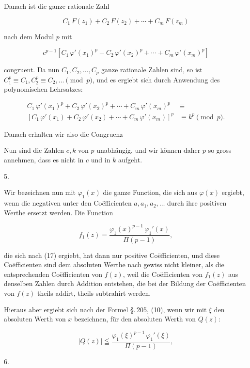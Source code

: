 Danach ist die ganze rationale Zahl

\[
C_1\,F(z_1)+C_2\,F(z_2)+\cdots+C_m\,F(z_m)
\]

nach dem Modul $p$ mit

\[
c^{p-1}\left[C_1\,\varphi'(x_1)^p+C_2\,\varphi'(x_2)^p+\cdots+C_m\,\varphi'(x_m)^p\right]
\]

congruent. Da nun $C_1, C_2, \ldots, C_p$ ganze rationale Zahlen sind, %
so ist $C_1^p\equiv C_1, C_2^p\equiv C_2, \ldots \pmod{p}$, und es ergiebt sich durch Anwendung des polynomischen Lehrsatzes:

\[
\begin{aligned}
C_1\,\varphi'(x_1)^p+C_2\,\varphi'(x_2)^p+\cdots+C_m\,\varphi'(x_m)^p &\equiv \\
\left[C_1\,\varphi'(x_1)+C_2\,\varphi'(x_2)+\cdots+C_m\,\varphi'(x_m)\right]^p &\equiv k^p \pmod{p}.
\end{aligned}
\]

Danach erhalten wir also die Congruenz


Nun sind die Zahlen $c, k$ von $p$ unabhängig, und wir können daher $p$ so gross annehmen, dass es nicht in $c$ und in $k$ aufgeht.

5. 

Wir bezeichnen nun mit $\varphi_1(x)$ die ganze Function, die sich aus $\varphi(x)$ ergiebt, wenn die negativen unter den Coëfficienten $a, a_1, a_2, \ldots$ durch ihre positiven Werthe ersetzt werden. Die Function

\[
f_1(z) = \dfrac{\varphi_1(x)^{p-1}\,\varphi_1'(x)}{\Pi(p-1)},
\]

die sich nach (17) ergiebt, hat dann nur positive Coëfficienten, und diese Coëfficienten sind dem absoluten Werthe nach gewiss nicht kleiner, als die entsprechenden Coëfficienten von $f(z)$, weil die Coëfficienten von $f_1(z)$ aus denselben Zahlen durch Addition entstehen, die bei der Bildung der Coëfficienten von $f(z)$ theils addirt, theils subtrahirt werden.

Hieraus aber ergiebt sich nach der Formel \S.\,205, (10), wenn wir mit $\xi$ den absoluten Werth von $x$ bezeichnen, für den absoluten Werth von $Q(z)$:

\[
|Q(z)| \leqq \dfrac{\varphi_1(\xi)^{p-1}\,\varphi_1'(\xi)}{\Pi(p-1)},
\]

6. 
